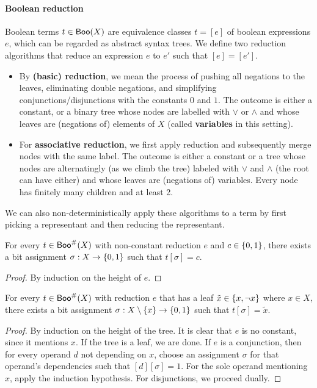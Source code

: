 \documentclass[a4paper]{memoir}
\begin{document}
\paragraph{Boolean reduction}
\begin{definition} \label{def:reduction}
	Boolean terms $t \in \mathsf{Boo}(X)$ are equivalence classes $t = [e]$ of boolean expressions $e$, which can be regarded as abstract syntax trees.
	We define two reduction algorithms that reduce an expression $e$ to $e'$ such that $[e] = [e']$.
	\begin{itemize}
		\item By \textbf{(basic) reduction}, we mean the process of pushing all negations to the leaves, eliminating double negations, and simplifying conjunctions/disjunctions with the constants $0$ and $1$.
		The outcome is either a constant, or a binary tree whose nodes are labelled with $\vee$ or $\wedge$ and whose leaves are (negations of) elements of $X$ (called \textbf{variables} in this setting).
		\item For \textbf{associative reduction}, we first apply reduction and subsequently merge nodes with the same label.
		The outcome is either a constant or a tree whose nodes are alternatingly (as we climb the tree) labeled with $\vee$ and $\wedge$ (the root can have either) and whose leaves are (negations of) variables.
		Every node has finitely many children and at least 2.
	\end{itemize}
	We can also non-deterministically apply these algorithms to a term by first picking a representant and then reducing the representant.
\end{definition}
\begin{lemma} \label{thm:boolexp-to-const-assignment}
	For every $t \in \mathsf{Boo}^\#(X)$ with non-constant reduction $e$ and $c \in \mathopen{}\left\{ 0, 1 \right\}\mathclose{}$, there exists a bit assignment $\sigma : X \to \mathopen{}\left\{ 0, 1 \right\}\mathclose{}$ such that $t[\sigma] = c$.
\end{lemma}
\begin{proof}
	By induction on the height of $e$.
\end{proof}
\begin{lemma} \label{thm:boolexp-to-var-assignment}
	For every $t \in \mathsf{Boo}^\#(X)$ with reduction $e$ that has a leaf $\tilde x \in \mathopen{}\left\{ x,\lnot x \right\}\mathclose{}$ where $x \in X$, there exists a bit assignment $\sigma : X \setminus \mathopen{}\left\{ x \right\}\mathclose{} \to \mathopen{}\left\{ 0, 1 \right\}\mathclose{}$ such that $t[\sigma] = \tilde x$.
\end{lemma}
\begin{proof}
	By induction on the height of the tree.
	It is clear that $e$ is no constant, since it mentions $x$.
	If the tree is a leaf, we are done.
	If $e$ is a conjunction, then for every operand $d$ not depending on $x$, choose an assignment $\sigma$ for that operand's dependencies such that $[d][\sigma] = 1$.
	For the sole operand mentioning $x$, apply the induction hypothesis.
	For disjunctions, we proceed dually.
\end{proof}
\end{document}
